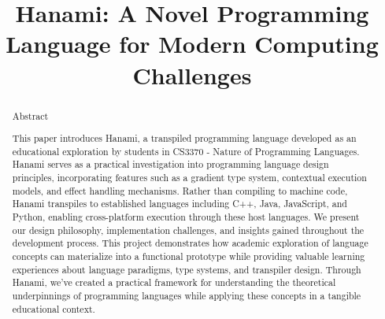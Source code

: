 \documentclass[conference]{IEEEtran}
\begin{document}
	
	\title{Hanami: A Novel Programming Language for Modern Computing Challenges}
	
	\author{
		\and
		\and
		\and
	}
	
	\maketitle
	
	\begin{abstract}
		Abstract
		
		This paper introduces Hanami, a transpiled programming language developed as an educational exploration by students in CS3370 - Nature of Programming Languages. Hanami serves as a practical investigation into programming language design principles, incorporating features such as a gradient type system, contextual execution models, and effect handling mechanisms. Rather than compiling to machine code, Hanami transpiles to established languages including C++, Java, JavaScript, and Python, enabling cross-platform execution through these host languages. We present our design philosophy, implementation challenges, and insights gained throughout the development process. This project demonstrates how academic exploration of language concepts can materialize into a functional prototype while providing valuable learning experiences about language paradigms, type systems, and transpiler design. Through Hanami, we've created a practical framework for understanding the theoretical underpinnings of programming languages while applying these concepts in a tangible educational context.
	\end{abstract}
	
\end{document}
